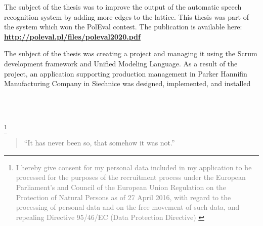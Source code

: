 \documentclass[10pt,a4paper,ragged2e,withhyper, normalphoto]{altacv}
\newcommand\blfootnote[1]{%
  \begingroup
  \renewcommand\thefootnote{}\footnote{#1}%
  \addtocounter{footnote}{-1}%
  \endgroup
}
\begin{document}
\begin{paracol}{2}
    \divider



The subject of the thesis was to improve the output of the automatic speech recognition system by adding more edges to the lattice. This thesis was part of the system which won the PolEval contest. The publication is available here:
\\ \textcolor{PastelRed}{\textbf{\url{http://poleval.pl/files/poleval2020.pdf}}}

\medskip

The subject of the thesis was creating a project and managing it using the Scrum development framework and Unified Modeling Language.
As a result of the project, an application supporting production management in Parker Hannifin Manufacturing Company in Siechnice was designed, implemented, and installed
\medskip


\\
 \\


\blfootnote{\textcolor{gray}{
I hereby give consent for my personal data included in my application to be processed for the purposes of the recruitment process under the European Parliament's and Council of the European Union Regulation on the Protection of Natural Persons as of 27 April 2016, with regard to the processing of personal data and on the free movement of such data, and repealing Directive 95/46/EC (Data Protection Directive)
}}


\switchcolumn


\begin{quote}
``It has never been so, that somehow it was not.''
\end{quote}
\medskip


\end{paracol}
\end{document}
